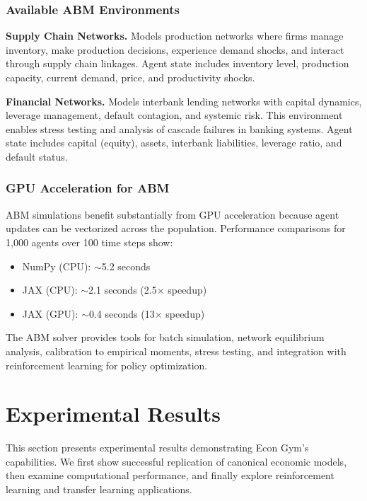 \documentclass[12pt]{article}
\begin{document}
\subsubsection{Available ABM Environments}

\textbf{Supply Chain Networks.} Models production networks where firms manage inventory, make production decisions, experience demand shocks, and interact through supply chain linkages. Agent state includes inventory level, production capacity, current demand, price, and productivity shocks.

\textbf{Financial Networks.} Models interbank lending networks with capital dynamics, leverage management, default contagion, and systemic risk. This environment enables stress testing and analysis of cascade failures in banking systems. Agent state includes capital (equity), assets, interbank liabilities, leverage ratio, and default status.

\subsubsection{GPU Acceleration for ABM}

ABM simulations benefit substantially from GPU acceleration because agent updates can be vectorized across the population. Performance comparisons for 1,000 agents over 100 time steps show:
\begin{itemize}
    \item NumPy (CPU): $\sim$5.2 seconds
    \item JAX (CPU): $\sim$2.1 seconds (2.5$\times$ speedup)
    \item JAX (GPU): $\sim$0.4 seconds (13$\times$ speedup)
\end{itemize}

The ABM solver provides tools for batch simulation, network equilibrium analysis, calibration to empirical moments, stress testing, and integration with reinforcement learning for policy optimization.

\section{Experimental Results} \label{sec:experiments}

This section presents experimental results demonstrating Econ Gym's capabilities. We first show successful replication of canonical economic models, then examine computational performance, and finally explore reinforcement learning and transfer learning applications.
\end{document}

